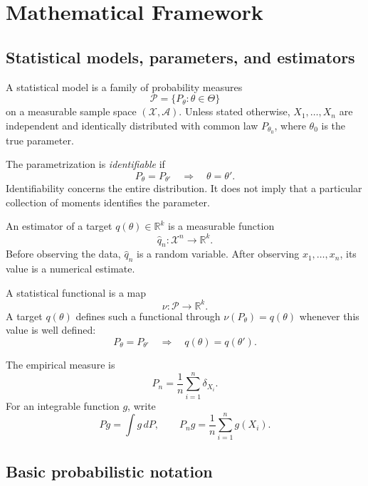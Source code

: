 \section{Mathematical Framework}

\subsection{Statistical models, parameters, and estimators}

\begin{definition}[Model]
A statistical model is a family of probability measures
\[
\mathcal P=\{P_\theta:\theta\in\Theta\}
\]
on a measurable sample space $(\mathcal X,\mathcal A)$.
Unless stated otherwise, $X_1,\ldots,X_n$ are independent and
identically distributed with common law $P_{\theta_0}$, where
$\theta_0$ is the true parameter.
\end{definition}

\begin{definition}
The parametrization is \emph{identifiable} if
\[
P_\theta=P_{\theta'}
\quad\Longrightarrow\quad
\theta=\theta'.
\]
Identifiability concerns the entire distribution. It does not imply
that a particular collection of moments identifies the parameter.
\end{definition}

\begin{definition}
An estimator of a target $q(\theta)\in\mathbb R^k$ is a measurable
function
\[
\widehat q_n:\mathcal X^n\longrightarrow\mathbb R^k.
\]
Before observing the data, $\widehat q_n$ is a random variable.
After observing $x_1,\ldots,x_n$, its value is a numerical estimate.

A statistical functional is a map
\[
\nu:\mathcal P\longrightarrow\mathbb R^k.
\]
A target $q(\theta)$ defines such a functional through
$\nu(P_\theta)=q(\theta)$ whenever this value is well defined:
\[
P_\theta=P_{\theta'}
\quad\Longrightarrow\quad
q(\theta)=q(\theta').
\]
\end{definition}
\begin{definition}
The empirical measure is
\[
P_n=\frac1n\sum_{i=1}^n\delta_{X_i}.
\]
For an integrable function $g$, write
\[
Pg=\int g\,dP,
\qquad
P_ng=\frac1n\sum_{i=1}^ng(X_i).
\]
\end{definition}

\subsection{Basic probabilistic notation}

